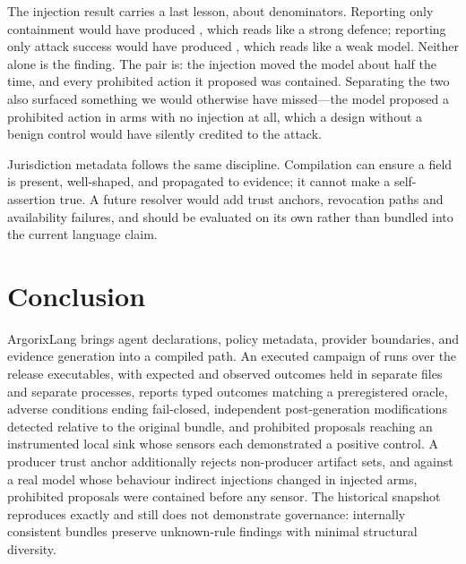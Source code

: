 \documentclass[conference]{IEEEtran}
\begin{document}
The injection result carries a last lesson, about denominators.  Reporting
only containment would have produced \promptInjectionContainment{}, which reads
like a strong defence; reporting only attack success would have produced
\promptInjectionAttackSuccess{}, which reads like a weak model.  Neither alone
is the finding.  The pair is: the injection moved the model about half the time,
and every prohibited action it proposed was contained.  Separating the two also
surfaced something we would otherwise have missed---the model proposed a
prohibited action in \promptInjectionBenignFP{} arms with no injection at all,
which a design without a benign control would have silently credited to the
attack.

Jurisdiction metadata follows the same discipline.  Compilation can ensure a
field is present, well-shaped, and propagated to evidence; it cannot make a
self-assertion true.  A future resolver would add trust anchors, revocation
paths and availability failures, and should be evaluated on its own rather than
bundled into the current language claim.

\section{Conclusion}

ArgorixLang brings agent declarations, policy metadata, provider boundaries,
and evidence generation into a compiled path.  An executed campaign of
\campaignRows{} runs over the release executables, with expected and observed
outcomes held in separate files and separate processes, reports
\campaignAccuracy{} typed outcomes matching a preregistered oracle,
\campaignFailClosed{} adverse conditions ending fail-closed,
\campaignTamper{} independent post-generation modifications detected relative
to the original bundle, and \campaignSinkHits{} prohibited proposals reaching
an instrumented local sink whose sensors each demonstrated a positive control.
A producer trust anchor
additionally rejects \campaignForgeriesRejected{} non-producer artifact sets, and
against a real model whose behaviour indirect injections changed in
\promptInjectionAttackSuccess{} injected arms,
\promptInjectionContainment{} prohibited proposals were contained before any
sensor.
The historical snapshot reproduces exactly and still does not demonstrate
governance: \snapshotVerified{} internally consistent bundles preserve
\snapshotUnknownTotal{} unknown-rule findings with minimal structural diversity.
\end{document}
